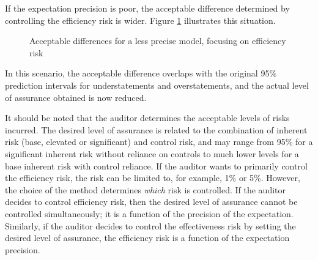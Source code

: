 \documentclass[12pt,a4paper]{memoir}
\begin{document}
If the expectation precision is poor, the acceptable difference determined by controlling the efficiency risk is wider. Figure \ref{fig:method_inefficiency_less_precise} illustrates this situation.

\begin{figure} 
\begin{center}
\caption{Acceptable differences for a less precise model, focusing on efficiency risk}

\label{fig:method_inefficiency_less_precise}
\end{center}
\end{figure}

In this scenario, the acceptable difference overlaps with the original 95\% prediction intervals for understatements and overstatements, and the actual level of assurance obtained is now reduced.

\bigskip
It should be noted that the auditor determines the acceptable levels of risks incurred. The desired level of assurance is related to the combination of inherent risk (base, elevated or significant) and control risk, and may range from 95\% for a significant inherent risk without reliance on controls to much lower levels for a base inherent risk with control reliance. If the auditor wants to primarily control the efficiency risk, the risk can be limited to, for example, 1\% or 5\%. However, the choice of the method determines \emph{which} risk is controlled. If the auditor decides to control efficiency risk, then the desired level of assurance cannot be controlled simultaneously; it is a function of the precision of the expectation. Similarly, if the auditor decides to control the effectiveness risk by setting the desired level of assurance, the efficiency risk is a function of the expectation precision. 
\end{document}
